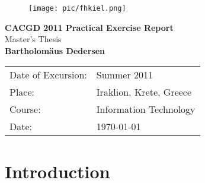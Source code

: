 \documentclass[bibtotocnumbered, headsepline,normalheadings,12pt]{report}
\begin{document}
\begin{titlepage}
\thispagestyle{empty}
 \begin{center}
 \begin{figure}[htbp]
    \centering
     \texttt{[image: pic/fhkiel.png]} 
\end{figure}

  \vspace*{2.5cm}
 {\bf \huge CACGD 2011 Practical Exercise Report}
 \vspace*{1cm} \\
 {\Large Master's Thesis\\}
 \vspace{0.5cm}
 {\Large \bfseries Bartholomäus Dedersen\\}
 \vfill
  \vspace*{1.5cm}
\begin{table}[h]
    \centering
    \begin{tabular}{l l}
        Date of Excursion: & Summer 2011 \\ 
        Place: & Iraklion, Krete, Greece \\ 
        Course: & Information Technology \\
        Date: & \today\\
    \end{tabular}
\end{table}

 \end{center}
\end{titlepage}


\begin{abstract}

    In this report about the practical part of the ``Computational Aspects of Computer Games Development'' programme for two weeks in Krete a
    game programming with the Python programming language is described. The controller is a neural interface for brainwave wavelength reception 
    through three skin-applied electrodes. The game is themed after a fictional Cretan Zombie incursion after the actual event.

\end{abstract}

\tableofcontents \newpage


\chapter{Introduction}
\label{chap:intro}
\end{document}
